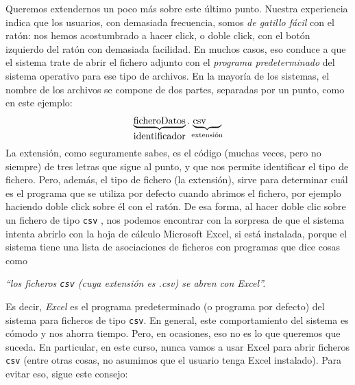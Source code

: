 \documentclass[10pt,a4paper]{article}
\newcounter {cont01}
\begin{document}
Queremos extendernos un poco más sobre este último punto. Nuestra experiencia indica que los
usuarios, con demasiada frecuencia, somos {\em de gatillo fácil} con el ratón: nos hemos
acostumbrado a hacer click, o doble click, con el botón izquierdo del ratón con demasiada
facilidad. En muchos casos, eso conduce a que el sistema trate de abrir el fichero adjunto  con el
{\em programa predeterminado} del sistema operativo para ese tipo de archivos. En la mayoría de los
sistemas, el nombre de los archivos se compone de dos partes, separadas por un punto, como en este
ejemplo:
\[
\underbrace{\mbox{ficheroDatos}}_{\mbox{identificador}}.\underbrace{\mbox{csv}\phantom{aaa}}_{\mbox{\scriptsize extensión}}
\]
La {\sf extensión}, como seguramente sabes, es el código (muchas veces, pero no siempre) de tres
letras que sigue al punto, y que nos permite identificar el tipo de fichero. Pero, además, el tipo
de fichero (la extensión), sirve para determinar cuál es el programa que se utiliza por defecto cuando abrimos el fichero, por ejemplo haciendo doble click sobre él con el ratón. De esa forma, al hacer doble clic sobre un fichero de tipo {\tt csv} , nos podemos encontrar con la sorpresa de que el sistema intenta abrirlo con la hoja de cálculo Microsoft Excel, si está instalada, porque el sistema tiene
una lista de asociaciones de ficheros con programas que dice cosas como
\begin{center}
{\em ``los ficheros {\tt csv}  (cuya extensión es {.csv}) se abren con Excel''.}
\end{center}
Es decir, {\em Excel} es el {\sf programa predeterminado} (o programa por defecto) del sistema para
ficheros de tipo {\tt csv}. En general, este comportamiento del sistema es cómodo y nos ahorra
tiempo. Pero, en ocasiones, eso no es lo que queremos que suceda. En particular, en este curso,
nunca vamos a usar Excel para abrir ficheros {\tt csv}  (entre otras cosas, no asumimos que el
usuario tenga Excel instalado). Para evitar eso, sigue este consejo:
        \begin{center}
        \end{center}
\end{document}
